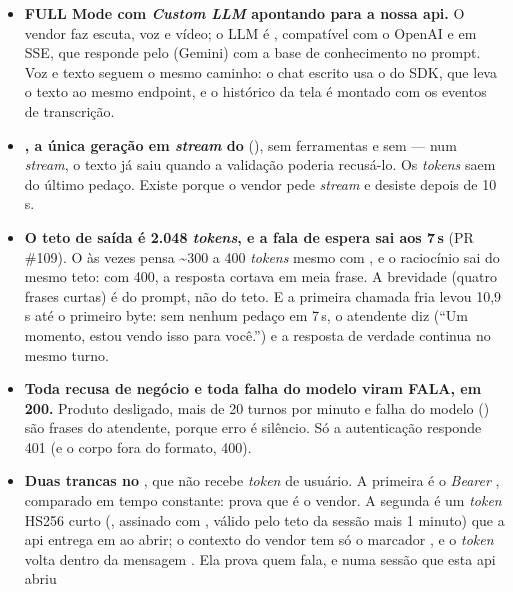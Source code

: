 \begin{itemize}
  \item \textbf{FULL Mode com \emph{Custom LLM} apontando para a nossa api.} O
    vendor faz escuta, voz e vídeo; o LLM é
    , compatível com o OpenAI e em SSE,
    que responde pelo  (Gemini) com a base de conhecimento no
    prompt. Voz e texto seguem o mesmo caminho: o chat escrito usa o
     do SDK, que leva o texto ao mesmo endpoint, e o histórico da
    tela é montado com os eventos de transcrição.
  \item \textbf{, a única geração em \emph{stream} do
    } (), sem ferramentas e sem
     --- num \emph{stream}, o texto já saiu quando a validação
    poderia recusá-lo. Os \emph{tokens} saem do último pedaço. Existe porque o
    vendor pede \emph{stream} e desiste depois de 10\,s.
  \item \textbf{O teto de saída é 2.048 \emph{tokens}, e a fala de espera sai
    aos 7\,s} (PR \#109). O  às vezes pensa
    \textasciitilde300 a 400 \emph{tokens} mesmo com , e o
    raciocínio sai do mesmo teto: com 400, a resposta cortava em meia frase.
    A brevidade (quatro frases curtas) é do prompt, não do teto. E a primeira
    chamada fria levou 10,9\,s até o primeiro byte: sem nenhum pedaço
    em 7\,s, o atendente diz  (\enquote{Um
    momento, estou vendo isso para você.}) e a resposta de verdade continua no
    mesmo turno.
  \item \textbf{Toda recusa de negócio e toda falha do modelo viram FALA, em
    200.} Produto desligado, mais de 20 turnos por minuto e falha do modelo
    () são frases do atendente, porque erro é silêncio. Só a
    autenticação responde 401 (e o corpo fora do formato, 400).
  \item \textbf{Duas trancas no }, que não recebe
    \emph{token} de usuário. A primeira é o \emph{Bearer}
    , comparado em tempo constante: prova que é o
    vendor. A segunda é um \emph{token} HS256 curto
    (, assinado com ,
    válido pelo teto da sessão mais 1 minuto) que a api entrega em
     ao abrir; o contexto do vendor tem só o
    marcador , e o \emph{token} volta dentro da
    mensagem . Ela prova quem fala, e numa sessão que esta api abriu

\end{itemize}
